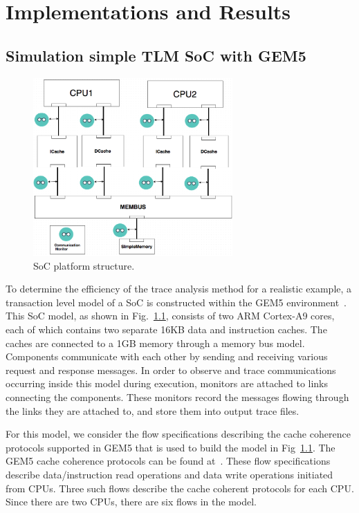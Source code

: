 \documentclass[12pt,frontmatter,copyright,thesis]{usfmanus}
\begin{document}
\chapter{Implementations and Results}

\section{Simulation simple TLM SoC with GEM5}
\begin{figure} 
\centerline{
\includegraphics[width=3in]{figures/Fig4.png}}
\caption{SoC platform structure.}
\label{SoC}
\end{figure}

To determine the efficiency of the trace analysis method for
a realistic example, a transaction level model of a SoC is
constructed within the GEM5 environment~\cite{Binkert2011}.
This SoC model, as shown in Fig.~\ref{SoC}, consists of two
ARM Cortex-A9 cores, each of which contains two separate
16KB data and instruction caches.  The caches are connected
to a 1GB memory through a memory bus model.  Components
communicate with each other by sending and receiving various
request and response messages.  In order to observe and
trace communications occurring inside this model during
execution, monitors are attached to links connecting the
components.  These monitors record the messages flowing
through the links they are attached to, and store them into
output trace files.

For this model, we consider the flow specifications
describing the cache coherence protocols supported in
GEM5 that is used to build the model in Fig~\ref{SoC}.
The GEM5 cache coherence protocols can be found at~\cite{gem5}.
These flow specifications describe data/instruction read
operations and data write operations initiated from CPUs.
Three such flows describe the cache coherent protocols for
each CPU.  Since there are two CPUs, there are six flows in
the model.
\end{document}
